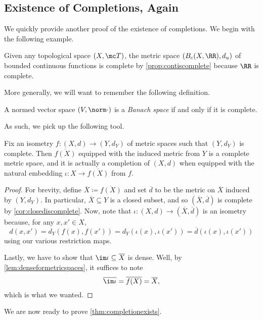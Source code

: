 \documentclass[../notes.tex]{subfiles}
\begin{document}
\subsection{Existence of Completions, Again}
We quickly provide another proof of the existence of completions. We begin with the following example.
\begin{example} \label{ex:embedintocomplete}
	Given any topological space $(X,\mc T)$, the metric space $(B_c(X,\RR),d_u)$ of bounded continuous functions is complete by \autoref{prop:contiscomplete} because $\RR$ is complete.
\end{example}
\qedhere More generally, we will want to remember the following definition.
\begin{definition}
	A normed vector space $(V,\norm\cdot)$ is a \textit{Banach space} if and only if it is complete.
\end{definition}
As such, we pick up the following tool.
\begin{lemma} \label{lem:completionfromembedding}
	Fix an isometry $f\colon(X,d)\to(Y,d_Y)$ of metric spaces such that $(Y,d_Y)$ is complete. Then $\overline{f(X)}$ equipped with the induced metric from $Y$ is a complete metric space, and it is actually a completion of $(X,d)$ when equipped with the natural embedding $\iota\colon X\to\overline{f(X)}$ from $f$.
\end{lemma}
\begin{proof}
	For brevity, define $\overline X\coloneqq\overline{f(X)}$ and set $\overline d$ to be the metric on $\overline X$ induced by $(Y,d_Y)$. In particular, $\overline X\subseteq Y$ is a closed subset, and so $(\overline X,\overline d)$ is complete by \autoref{cor:closediscomplete}. Now, note that $\iota\colon(X,d)\to(\overline X,\overline d)$ is an isometry because, for any $x,x'\in X$,
	\[d(x,x')=d_Y(f(x),f(x'))=d_Y(\iota(x),\iota(x'))=\overline d(\iota(x),\iota(x'))\]
	using our various restriction maps.

	Lastly, we have to show that $\im\iota\subseteq\overline X$ is dense. Well, by \autoref{lem:denseformetricspaces}, it suffices to note
	\[\overline{\im\iota}=\overline{f(X)}=\overline X,\]
	which is what we wanted.
\end{proof}
We are now ready to prove \autoref{thm:completionexists}.
\completionexists*
\end{document}
